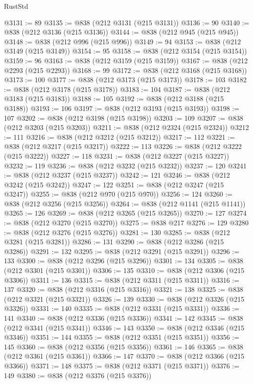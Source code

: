 \begin{lexlean}{RustStd}
\begin{coremodule}
{\begin{coremodule}
{{{{{{{{{{{{{{{{{{{{{{{{{{{{{{{{{{{{{{{{{{{{{{{{{{{{{{{@3131 := 89
@3135 := @838 (@212 @3131 (@215 @3131))
@3136 := 90
@3140 := @838 (@212 @3136 (@215 @3136))
@3144 := @838 (@212 @945 (@215 @945))
@3148 := @838 (@212 @996 (@215 @996))
@3149 := 94
@3153 := @838 (@212 @3149 (@215 @3149))
@3154 := 95
@3158 := @838 (@212 @3154 (@215 @3154))
@3159 := 96
@3163 := @838 (@212 @3159 (@215 @3159))
@3167 := @838 (@212 @2293 (@215 @2293))
@3168 := 99
@3172 := @838 (@212 @3168 (@215 @3168))
@3173 := 100
@3177 := @838 (@212 @3173 (@215 @3173))
@3178 := 103
@3182 := @838 (@212 @3178 (@215 @3178))
@3183 := 104
@3187 := @838 (@212 @3183 (@215 @3183))
@3188 := 105
@3192 := @838 (@212 @3188 (@215 @3188))
@3193 := 106
@3197 := @838 (@212 @3193 (@215 @3193))
@3198 := 107
@3202 := @838 (@212 @3198 (@215 @3198))
@3203 := 109
@3207 := @838 (@212 @3203 (@215 @3203))
@3211 := @838 (@212 @2324 (@215 @2324))
@3212 := 111
@3216 := @838 (@212 @3212 (@215 @3212))
@3217 := 112
@3221 := @838 (@212 @3217 (@215 @3217))
@3222 := 113
@3226 := @838 (@212 @3222 (@215 @3222))
@3227 := 118
@3231 := @838 (@212 @3227 (@215 @3227))
@3232 := 119
@3236 := @838 (@212 @3232 (@215 @3232))
@3237 := 120
@3241 := @838 (@212 @3237 (@215 @3237))
@3242 := 121
@3246 := @838 (@212 @3242 (@215 @3242))
@3247 := 122
@3251 := @838 (@212 @3247 (@215 @3247))
@3255 := @838 (@212 @970 (@215 @970))
@3256 := 124
@3260 := @838 (@212 @3256 (@215 @3256))
@3264 := @838 (@212 @1141 (@215 @1141))
@3265 := 126
@3269 := @838 (@212 @3265 (@215 @3265))
@3270 := 127
@3274 := @838 (@212 @3270 (@215 @3270))
@3275 := @838 @217
@3276 := 129
@3280 := @838 (@212 @3276 (@215 @3276))
@3281 := 130
@3285 := @838 (@212 @3281 (@215 @3281))
@3286 := 131
@3290 := @838 (@212 @3286 (@215 @3286))
@3291 := 132
@3295 := @838 (@212 @3291 (@215 @3291))
@3296 := 133
@3300 := @838 (@212 @3296 (@215 @3296))
@3301 := 134
@3305 := @838 (@212 @3301 (@215 @3301))
@3306 := 135
@3310 := @838 (@212 @3306 (@215 @3306))
@3311 := 136
@3315 := @838 (@212 @3311 (@215 @3311))
@3316 := 137
@3320 := @838 (@212 @3316 (@215 @3316))
@3321 := 138
@3325 := @838 (@212 @3321 (@215 @3321))
@3326 := 139
@3330 := @838 (@212 @3326 (@215 @3326))
@3331 := 140
@3335 := @838 (@212 @3331 (@215 @3331))
@3336 := 141
@3340 := @838 (@212 @3336 (@215 @3336))
@3341 := 142
@3345 := @838 (@212 @3341 (@215 @3341))
@3346 := 143
@3350 := @838 (@212 @3346 (@215 @3346))
@3351 := 144
@3355 := @838 (@212 @3351 (@215 @3351))
@3356 := 145
@3360 := @838 (@212 @3356 (@215 @3356))
@3361 := 146
@3365 := @838 (@212 @3361 (@215 @3361))
@3366 := 147
@3370 := @838 (@212 @3366 (@215 @3366))
@3371 := 148
@3375 := @838 (@212 @3371 (@215 @3371))
@3376 := 149
@3380 := @838 (@212 @3376 (@215 @3376))
}}}}}}}}}}}}}}}}}}}}}}}}}}}}}}}}}}}}}}}}}}}}}}}}}}}}}}}
\end{coremodule}}
\end{coremodule}
\end{lexlean}
